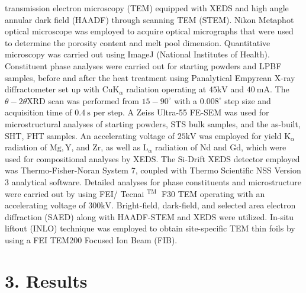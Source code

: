 \documentclass[10pt]{article}
\begin{document}
transmission electron microscopy (TEM) equipped with XEDS and high angle annular dark field (HAADF) through scanning TEM (STEM). Nikon Metaphot optical microscope was employed to acquire optical micrographs that were used to determine the porosity content and melt pool dimension. Quantitative microscopy was carried out using ImageJ (National Institutes of Health). Constituent phase analyses were carried out for starting powders and LPBF samples, before and after the heat treatment using Panalytical Empyrean X-ray diffractometer set up with $\mathrm{Cu} \mathrm{K}_{\alpha}$ radiation operating at $45 \mathrm{kV}$ and $40 \mathrm{~mA}$. The $\theta-2 \theta \mathrm{XRD}$ scan was performed from $15-90^{\circ}$ with a $0.008^{\circ}$ step size and acquisition time of $0.4 \mathrm{~s}$ per step. A Zeiss Ultra-55 FE-SEM was used for microstructural analyses of starting powders, STS bulk samples, and the as-built, SHT, FHT samples. An accelerating voltage of $25 \mathrm{kV}$ was employed for yield $\mathrm{K}_{\alpha}$ radiation of $\mathrm{Mg}, \mathrm{Y}$, and $\mathrm{Zr}$, as well as $\mathrm{L}_{\alpha}$ radiation of $\mathrm{Nd}$ and $\mathrm{Gd}$, which were used for compositional analyses by XEDS. The Si-Drift XEDS detector employed was Thermo-Fisher-Noran System 7, coupled with Thermo Scientific NSS Version 3 analytical software. Detailed analyses for phase constituents and microstructure were carried out by using FEI/ Tecnai ${ }^{\text {TM }}$ F30 TEM operating with an accelerating voltage of $300 \mathrm{kV}$. Bright-field, dark-field, and selected area electron diffraction (SAED) along with HAADF-STEM and XEDS were utilized. In-situ liftout (INLO) technique was employed to obtain site-specific TEM thin foils by using a FEI TEM200 Focused Ion Beam (FIB).

\section*{3. Results}
\end{document}
